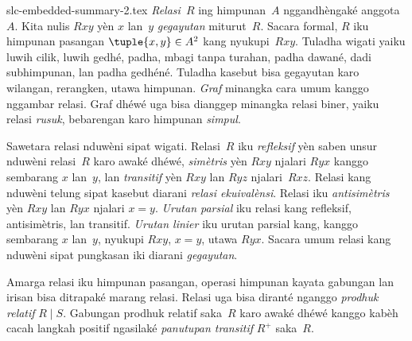\begin{filecontents*}[overwrite]{slc-embedded-summary-2.tex}
\emph{Relasi}~$R$ ing himpunan~$A$ nggandhèngaké anggota~$A$.
Kita nulis $Rxy$ yèn $x$ lan~$y$ \emph{gegayutan} miturut~$R$.
Sacara formal, $R$ iku himpunan pasangan $\tuple{x,y}\in A^2$
kang nyukupi~$Rxy$. Tuladha wigati yaiku luwih cilik, luwih gedhé,
padha, mbagi tanpa turahan, padha dawané, dadi subhimpunan, lan
padha gedhéné. Tuladha kasebut bisa gegayutan karo wilangan,
rerangken, utawa himpunan. \emph{Graf} minangka cara umum kanggo
nggambar relasi. Graf dhéwé uga bisa dianggep minangka relasi
biner, yaiku relasi \emph{rusuk}, bebarengan karo himpunan \emph{simpul}.

Sawetara relasi nduwèni sipat wigati. Relasi~$R$ iku \emph{refleksif}
yèn saben unsur nduwèni relasi~$R$ karo awaké dhéwé, \emph{simètris}
yèn $Rxy$ njalari $Ryx$ kanggo sembarang $x$ lan~$y$, lan
\emph{transitif} yèn $Rxy$ lan $Ryz$ njalari~$Rxz$. Relasi kang
nduwèni telung sipat kasebut diarani \emph{relasi ekuivalènsi}.
Relasi iku \emph{antisimètris} yèn $Rxy$ lan $Ryx$ njalari $x=y$.
\emph{Urutan parsial} iku relasi kang refleksif, antisimètris, lan
transitif. \emph{Urutan linier} iku urutan parsial kang, kanggo
sembarang $x$ lan~$y$, nyukupi $Rxy$, $x=y$, utawa $Ryx$.
Sacara umum relasi kang nduwèni sipat pungkasan iki diarani
\emph{gegayutan}.

Amarga relasi iku himpunan pasangan, operasi himpunan kayata
gabungan lan irisan bisa ditrapaké marang relasi. Relasi uga
bisa diranté nganggo \emph{prodhuk relatif} $R\mid S$.
Gabungan prodhuk relatif saka~$R$ karo awaké dhéwé kanggo
kabèh cacah langkah positif ngasilaké \emph{panutupan transitif}
$R^+$ saka~$R$.
\end{filecontents*}

